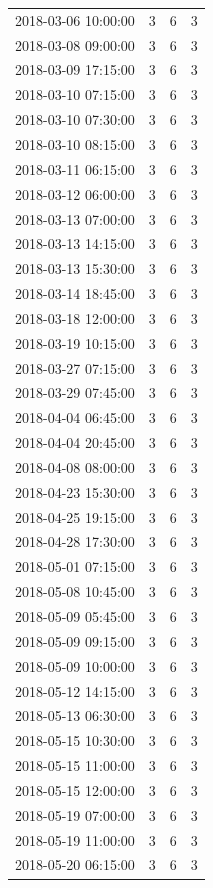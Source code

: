 \begin{tabular}{lrrr}
2018-03-06 10:00:00 & 3 & 6 & 3 \\
2018-03-08 09:00:00 & 3 & 6 & 3 \\
2018-03-09 17:15:00 & 3 & 6 & 3 \\
2018-03-10 07:15:00 & 3 & 6 & 3 \\
2018-03-10 07:30:00 & 3 & 6 & 3 \\
2018-03-10 08:15:00 & 3 & 6 & 3 \\
2018-03-11 06:15:00 & 3 & 6 & 3 \\
2018-03-12 06:00:00 & 3 & 6 & 3 \\
2018-03-13 07:00:00 & 3 & 6 & 3 \\
2018-03-13 14:15:00 & 3 & 6 & 3 \\
2018-03-13 15:30:00 & 3 & 6 & 3 \\
2018-03-14 18:45:00 & 3 & 6 & 3 \\
2018-03-18 12:00:00 & 3 & 6 & 3 \\
2018-03-19 10:15:00 & 3 & 6 & 3 \\
2018-03-27 07:15:00 & 3 & 6 & 3 \\
2018-03-29 07:45:00 & 3 & 6 & 3 \\
2018-04-04 06:45:00 & 3 & 6 & 3 \\
2018-04-04 20:45:00 & 3 & 6 & 3 \\
2018-04-08 08:00:00 & 3 & 6 & 3 \\
2018-04-23 15:30:00 & 3 & 6 & 3 \\
2018-04-25 19:15:00 & 3 & 6 & 3 \\
2018-04-28 17:30:00 & 3 & 6 & 3 \\
2018-05-01 07:15:00 & 3 & 6 & 3 \\
2018-05-08 10:45:00 & 3 & 6 & 3 \\
2018-05-09 05:45:00 & 3 & 6 & 3 \\
2018-05-09 09:15:00 & 3 & 6 & 3 \\
2018-05-09 10:00:00 & 3 & 6 & 3 \\
2018-05-12 14:15:00 & 3 & 6 & 3 \\
2018-05-13 06:30:00 & 3 & 6 & 3 \\
2018-05-15 10:30:00 & 3 & 6 & 3 \\
2018-05-15 11:00:00 & 3 & 6 & 3 \\
2018-05-15 12:00:00 & 3 & 6 & 3 \\
2018-05-19 07:00:00 & 3 & 6 & 3 \\
2018-05-19 11:00:00 & 3 & 6 & 3 \\
2018-05-20 06:15:00 & 3 & 6 & 3 \\

\end{tabular}
